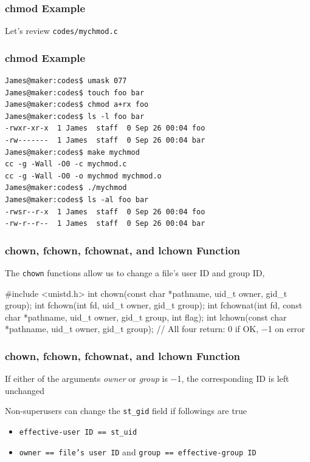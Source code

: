 \documentclass[newPxFont,sthlmFooter,nooffset]{beamer}
\begin{document}
\begin{frame}[containsverbatim,t]
  \frametitle{chmod Example}
Let's review \texttt{codes/mychmod.c}

\end{frame}

\begin{frame}
  \frametitle{chmod Example}
\begin{verbatim}
James@maker:codes$ umask 077
James@maker:codes$ touch foo bar
James@maker:codes$ chmod a+rx foo
James@maker:codes$ ls -l foo bar
-rwxr-xr-x  1 James  staff  0 Sep 26 00:04 foo
-rw-------  1 James  staff  0 Sep 26 00:04 bar
James@maker:codes$ make mychmod
cc -g -Wall -O0 -c mychmod.c
cc -g -Wall -O0 -o mychmod mychmod.o
James@maker:codes$ ./mychmod
James@maker:codes$ ls -al foo bar
-rwsr--r-x  1 James  staff  0 Sep 26 00:04 foo
-rw-r--r--  1 James  staff  0 Sep 26 00:04 bar
\end{verbatim}
\end{frame}


\begin{frame}[containsverbatim,t]
  \frametitle{chown, fchown, fchownat, and lchown Function}
The \texttt{chown} functions allow us to change a file’s user ID and group ID, 

\bigskip
\begin{codedef}
#include <unistd.h>
int chown(const char *pathname, uid_t owner, gid_t group);
int fchown(int fd, uid_t owner, gid_t group);
int fchownat(int fd, const char *pathname, uid_t owner, gid_t group, int flag);
int lchown(const char *pathname, uid_t owner, gid_t group);
// All four return: 0 if OK, −1 on error
\end{codedef}
\end{frame}


\begin{frame}[t]
  \frametitle{chown, fchown, fchownat, and lchown Function}
If either of the arguments \textit{owner} or \textit{group} is −1, the corresponding ID is left unchanged

\bigskip
Non-superusers can change the \texttt{st\_gid} field if followings are true
\begin{itemize}
\item \texttt{effective-user ID == st\_uid}
\item \texttt{owner == file's user ID} and \texttt{group == effective-group ID}
\end{itemize}
\end{frame}
\end{document}
